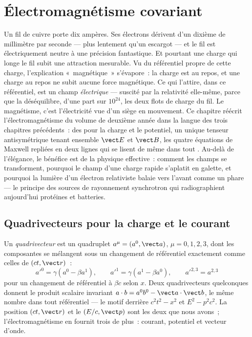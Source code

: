 \chapter{Électromagnétisme covariant}\label{ch:b3:covariant-electromagnetism}

Un fil de cuivre porte dix ampères. Ses électrons dérivent d'un
dixième de millimètre par seconde --- plus lentement qu'un escargot ---
et le fil est électriquement neutre à une précision fantastique. Et
pourtant une charge qui longe le fil subit une attraction mesurable. Vu
du référentiel propre de cette charge, l'explication «~magnétique~»
s'évapore~: la charge est au repos, et une charge au repos ne subit
aucune force magnétique. Ce qui l'attire, dans ce référentiel, est un
champ \emph{électrique} --- suscité par la relativité elle-même, parce
que la  déséquilibre, d'une part sur
$10^{24}$, les deux flots de charge du fil. Le magnétisme, c'est
l'électricité vue d'un siège en mouvement. Ce chapitre réécrit
l'électromagnétisme du volume de deuxième année dans la langue des
trois chapitres précédents~: des  pour la charge et le
potentiel, un unique tenseur antisymétrique tenant ensemble $\vect E$
et $\vect B$, les quatre équations de Maxwell repliées en deux lignes
qui se lisent de même dans tout . Au-delà de
l'élégance, le bénéfice est de la physique effective~: comment les
champs se transforment, pourquoi le champ d'une charge rapide s'aplatit
en galette, et pourquoi la lumière d'un électron relativiste balaie
vers l'avant comme un phare --- le principe des sources de rayonnement
synchrotron qui radiographient aujourd'hui protéines et batteries.

\section{Quadrivecteurs pour la charge et le courant}

\begin{definition}[Quadrivecteurs]\label{def:b3:covariant-electromagnetism:fourvector}
Un \emph{quadrivecteur} est un quadruplet $a^\mu = (a^0, \vect a)$, $\mu =
0, 1, 2, 3$, dont les composantes se mélangent sous un changement de
référentiel exactement comme celles de $(ct,
\vect r)$~:
\[
a'^0 = \gamma(a^0 - \beta a^1) , \qquad
a'^1 = \gamma(a^1 - \beta a^0) , \qquad
a'^{2,3} = a^{2,3}
\]
pour un changement de référentiel à $\beta c$ selon $x$. Deux
quadrivecteurs quelconques donnent le produit scalaire invariant
$a\cdot b = a^0b^0 - \vect a\cdot\vect b$, le même nombre dans tout
référentiel --- le motif derrière $c^2t^2 - x^2$ et $E^2 - p^2c^2$. La
position $(ct, \vect r)$ et le 
$(E/c, \vect p)$ sont les deux que nous avons~; l'électromagnétisme en
fournit trois de plus~: courant, potentiel et vecteur d'onde.
\end{definition}

